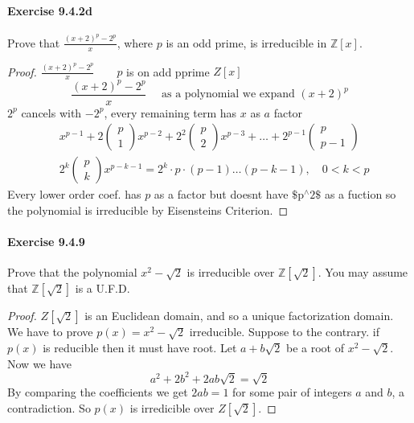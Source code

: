 \documentclass{article}
\theoremstyle{definition}
\begin{document}
\paragraph{Exercise 9.4.2d} Prove that $\frac{(x+2)^p-2^p}{x}$, where $p$ is an odd prime, is irreducible in $\mathbb{Z}[x]$.
\begin{proof}
$\frac{(x+2)^p-2^p}{x} \quad \quad p$ is on add pprime $Z[x]$
$$
\frac{(x+2)^p-2^p}{x} \quad \text { as a polynomial we expand }(x+2)^p
$$
$2^p$ cancels with $-2^p$, every remaining term has $x$ as $a$ factor
$$
\begin{aligned}
& x^{p-1}+2\left(\begin{array}{l}
p \\
1
\end{array}\right) x^{p-2}+2^2\left(\begin{array}{l}
p \\
2
\end{array}\right) x^{p-3}+\ldots+2^{p-1}\left(\begin{array}{c}
p \\
p-1
\end{array}\right) \\
& 2^k\left(\begin{array}{l}
p \\
k
\end{array}\right) x^{p-k-1}=2^k \cdot p \cdot(p-1) \ldots(p-k-1), \quad 0<k<p
\end{aligned}
$$
Every lower order coef. has $p$ as a factor but doesnt have $\$ \mathrm{p}^{\wedge} 2 \$$ as a fuction so the polynomial is irreducible by Eisensteins Criterion.
\end{proof}



\paragraph{Exercise 9.4.9} Prove that the polynomial $x^{2}-\sqrt{2}$ is irreducible over $\mathbb{Z}[\sqrt{2}]$. You may assume that $\mathbb{Z}[\sqrt{2}]$ is a U.F.D.
\begin{proof}
$Z[\sqrt{2}]$ is an Euclidean domain, and so a unique factorization domain.
We have to prove $p(x)=x^2-\sqrt{2}$ irreducible.
Suppose to the contrary.
if $p(x)$ is reducible then it must have root.
Let $a+b \sqrt{2}$ be a root of $x^2-\sqrt{2}$.
Now we have
$$
a^2+2 b^2+2 a b \sqrt{2}=\sqrt{2}
$$
By comparing the coefficients we get $2 a b=1$ for some pair of integers $a$ and $b$, a contradiction.
So $p(x)$ is irredicible over $Z[\sqrt{2}]$.
\end{proof}
\end{document}
